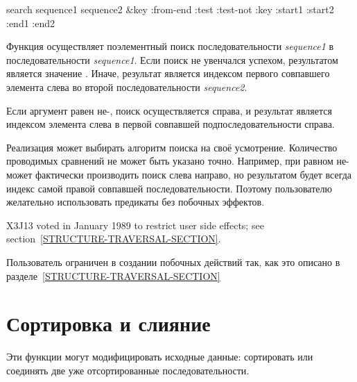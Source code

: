 \begin{defun}[Функция]
search sequence1 sequence2 &key :from-end :test :test-not :key :start1 :start2 :end1 :end2

Функция осуществляет поэлементный поиск последовательности \emph{sequence1} в
последовательности \emph{sequence1}.
Если поиск не увенчался успехом, результатом является значение {\false}. Иначе,
результат является индексом первого совпавшего элемента слева во второй
последовательности \emph{sequence2}.

Если аргумент  равен не-{\false}, поиск осуществляется справа, и
результат является индексом элемента слева в первой совпавшей
подпоследовательности справа.

Реализация может выбирать алгоритм поиска на своё усмотрение. Количество
проводимых сравнений не может быть указано точно.
Например,  при  равном не-{\nil} может фактически
производить поиск слева направо, но результатом будет всегда индекс самой правой
совпавшей последовательности. Поэтому пользователю желательно использовать
предикаты без побочных эффектов.

\begin{new}
X3J13 voted in January 1989
to restrict user side effects; see section~\ref{STRUCTURE-TRAVERSAL-SECTION}.
\end{new}

Пользователь ограничен в создании побочных действий так, как это описано в
разделе~\ref{STRUCTURE-TRAVERSAL-SECTION}
\end{defun}

\section{Сортировка и слияние}

Эти функции могут модифицировать исходные данные:
сортировать или соединять две уже отсортированные последовательности.

